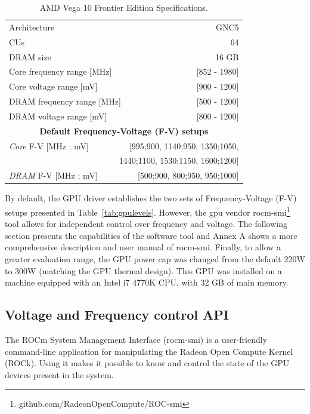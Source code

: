 \begin{table}[htbp]
    \caption{AMD Vega 10 Frontier Edition Specifications.}
    \begin{center}
            \begin{tabular}{lr}
                \hline
                {Architecture} & GNC5\\
                {CUs} & 64\\
                {DRAM size} & 16 GB\\
                {Core frequency range [MHz]} & [852 - 1980]\\
                {Core voltage range [mV]} & [900 - 1200]\\
                {DRAM  frequency range [MHz]} & [500 - 1200] \\ 
                {DRAM  voltage range [mV]} & [800 - 1200] \\
                \hline
                \multicolumn{2}{c}{\textbf{Default Frequency-Voltage (F-V) setups}}\\
                \hline
                {\textit{Core} F-V [MHz ; mV]} & [995;900, 1140;950, 1350;1050, \\
                \multicolumn{2}{r}{ 1440;1100, 1530;1150, 1600;1200{]}} \\
                {\textit{DRAM} F-V [MHz ; mV]} & [500;900, 800;950, 950;1000] \\
                \hline
            \end{tabular}%
    \end{center}
    \label{tab:Vega10specs}
\end{table}

By default, the GPU driver establishes the two sets of Frequency-Voltage (F-V) setups presented in Table~\ref{tab:gpulevels}. However, the \acrshort{gpu} vendor rocm-smi\footnote{github.com/RadeonOpenCompute/ROC-smi} tool allows for independent control over frequency and voltage. The following section presents the capabilities of the software tool and Annex A shows a more comprehensive description and user manual of rocm-smi. Finally, to allow a greater evaluation range, the GPU power cap was changed from the default 220W to 300W (matching the GPU thermal design). This GPU was installed on a machine equipped with an Intel i7 4770K CPU, with 32 GB of main memory. 




\subsection{Voltage and Frequency control API}
The ROCm System Management Interface (rocm-smi) \cite{noauthor_radeonopencompute/roc-smi_2019} is a user-friendly command-line application for manipulating the Radeon Open Compute Kernel (ROCk). Using it makes it possible to know and control the state of the GPU devices present in the system. 

